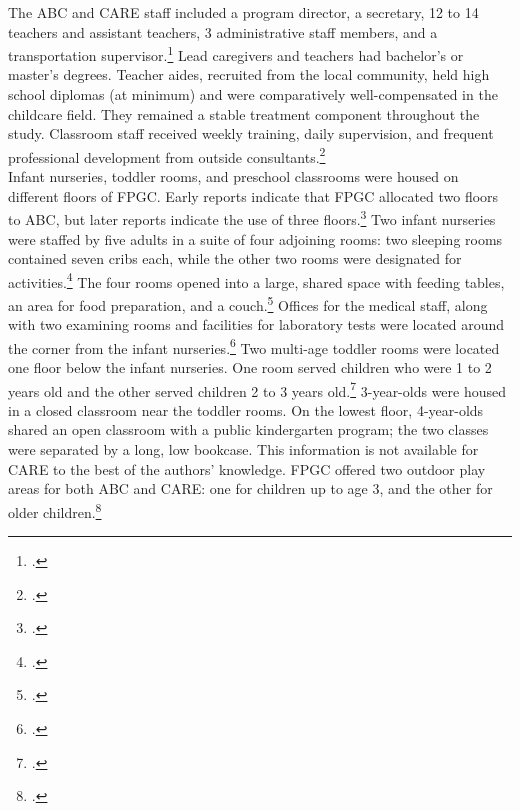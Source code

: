 \begin{appendices}
\noindent The ABC and CARE staff included a program director, a secretary, 12 to 14 teachers and assistant teachers, 3 administrative staff members, and a transportation supervisor.\footnote{\citet{Ramey-et-al_1977_Intro-to-ABC,Ramey_McGinness_etal_1982_Abecedarianapproach, Bryant_et_al_1987_Carolina_Approach_TIECSE}.} Lead caregivers and teachers had bachelor's or master's degrees. Teacher aides, recruited from the local community, held high school diplomas (at minimum) and were comparatively well-compensated in the childcare field. They remained a stable treatment component throughout the study. Classroom staff received weekly training, daily supervision, and frequent professional development from outside consultants.\footnote{\citet{Obrien-Sanders_1974_ABC-brochure, Ramey_etal_1985_Project-CARE_TiECSE, Sanders-Stokes_1979_Status-Report,Klein-Sanders_1982_Status-Report,abc2014-2015interviews}.}\\

\noindent Infant nurseries, toddler rooms, and preschool classrooms were housed on different floors of FPGC. Early reports indicate that FPGC allocated two floors to ABC, but later reports indicate the use of three floors.\footnote{\citet{Ramey_Smith_1977_AJMD,Ramey_Campbell_1979_SR,Ramey_1981_Modification}.} Two infant nurseries were staffed by five adults in a suite of four adjoining rooms: two sleeping rooms contained seven cribs each, while the other two rooms were designated for activities.\footnote{ \citet{Ramey-et-al_1977_Intro-to-ABC}.} The four rooms opened into a large, shared space with feeding tables, an area for food preparation, and a couch.\footnote{\citet{Ramey_Campbell_1979_SR}.} Offices for the medical staff, along with two examining rooms and facilities for laboratory tests were located around the corner from the infant nurseries.\footnote{\citet{abc2014-2015interviews}.} Two multi-age toddler rooms were located one floor below the infant nurseries. One room served children who were 1 to 2 years old and the other served children 2 to 3 years old.\footnote{\citet{Ramey_Smith_1977_AJMD,Ramey_Campbell_1979_SR}.} 3-year-olds were housed in a closed classroom near the toddler rooms. On the lowest floor, 4-year-olds shared an open classroom with a public kindergarten program; the two classes were separated by a long, low bookcase. This information is not available for CARE to the best of the authors' knowledge. FPGC offered two outdoor play areas for both ABC and CARE: one for children up to age 3, and the other for older children.\footnote{\citet{Ramey_Campbell_1979_SR,Ramey_McGinness_etal_1982_Abecedarianapproach}.}\\


\end{appendices}
